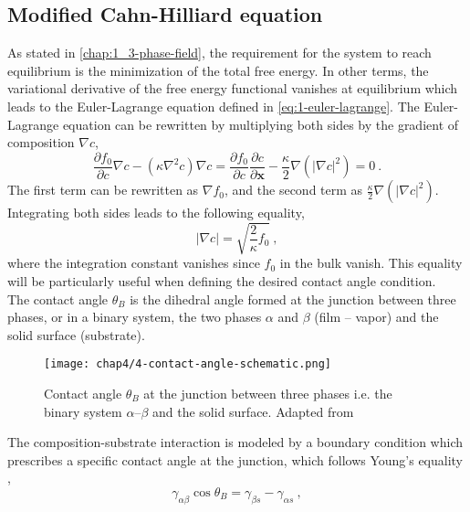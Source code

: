 \subsection{Modified Cahn-Hilliard equation}
    As stated in \autoref{chap:1_3-phase-field}, the requirement for the system to reach equilibrium is the minimization of the total free energy. In other terms, the variational derivative of the free energy functional vanishes at equilibrium which leads to the Euler-Lagrange equation defined in \autoref{eq:1-euler-lagrange}. The Euler-Lagrange equation can be rewritten by multiplying both sides by the gradient of composition $\nabla c$,
    \begin{equation}
        \frac{\partial f_0}{\partial c} \nabla c  - (\kappa \nabla^2 c) \nabla c = \frac{\partial f_0}{\partial c} \frac{\partial c}{\partial \mathbf{x}} - \frac{\kappa}{2} \nabla (|\nabla c|^2)=0\ .
    \end{equation}
    The first term can be rewritten as $\nabla f_0$, and the second term as $\frac{\kappa}{2}\nabla (|\nabla c|^2)$. Integrating both sides leads to the following equality,
    \begin{equation}
        |\nabla c| = \sqrt{\frac{2}{\kappa} f_0}\ ,
        \label{eq:4-grad2-approx}
    \end{equation}
    where the integration constant vanishes since $f_0$ in the bulk vanish. This equality will be particularly useful when defining the desired contact angle condition.\\
    The contact angle $\theta_B$ is the dihedral angle \cite{LeeKim2011} formed at the junction between three phases, or in a binary system, the two phases $\alpha$ and $\beta$ (film -- vapor) and the solid surface (substrate).
    \begin{figure}[H]
        \centering
        \texttt{[image: chap4/4-contact-angle-schematic.png]}
        \caption{Contact angle $\theta_B$ at the junction between three phases i.e. the binary system $\alpha$--$\beta$ and the solid surface. Adapted from \cite{LeeKim2011}}
        \label{fig:4-contact-angle}
    \end{figure}
    The composition-substrate interaction is modeled by a boundary condition which prescribes a specific contact angle at the junction, which follows Young's equality \cite{LeeKim2011},
    \begin{equation}
        \gamma_{\alpha\beta} \cos{\theta_B} = \gamma_{\beta s} - \gamma_{\alpha s}\ ,
    \end{equation}
